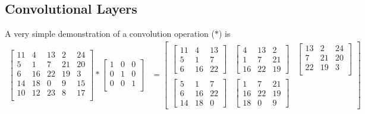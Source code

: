 \documentclass[../../deep_learning_notes.tex]{subfiles}
\begin{document}
\subsection{Convolutional Layers}
A very simple demonstration of a convolution operation ($*$) is 
\begin{align*}
    \begin{bmatrix}
        11  &4 &13  &2 &24\\
        5   &1  &7 &21 &20\\
        6  &16 &22 &19  &3\\
       14  &18  &0  &9 &15\\
       10  &12 &23  &8 &17\\
    \end{bmatrix} *
    \begin{bmatrix}
        1 &0 &0\\
        0 &1 &0\\
        0 &0 &1\\
    \end{bmatrix} &= 
    \begin{bmatrix}
        \begin{bmatrix}
            11  &4 &13\\
            5   &1  &7\\
            6  &16 &22
        \end{bmatrix}
        &\begin{bmatrix}
            4 &13  &2\\
            1  &7 &21\\
            16 &22 &19
        \end{bmatrix}
        &\begin{bmatrix}
            13  &2 &24\\
            7 &21 &20\\
            22 &19  &3\\
        \end{bmatrix}\\
        \begin{bmatrix}
            5   &1  &7\\
            6  &16 &22\\
            14  &18 &0
        \end{bmatrix}
        &\begin{bmatrix}
            1  &7 &21\\
            16 &22 &19\\
            18 &0 &9
        \end{bmatrix}

\end{bmatrix}
\end{align*}
\end{document}
